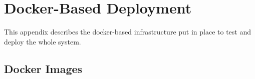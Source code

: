 \chapter{Docker-Based Deployment}
\label{sec:docker}

This appendix describes the docker-based infrastructure put in place to test and deploy the whole system.

\section{Docker Images}
\label{sec:docker-images}








